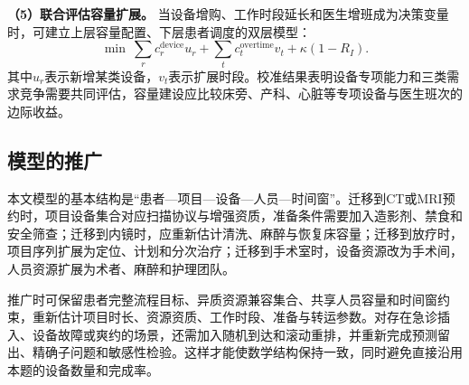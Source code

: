 \textbf{（5）联合评估容量扩展。} 当设备增购、工作时段延长和医生增班成为决策变量时，可建立上层容量配置、下层患者调度的双层模型：
\begin{equation}
\min\ \sum_r c_r^{\mathrm{device}}u_r+
\sum_t c_t^{\mathrm{overtime}}v_t+\kappa(1-R_I).
\end{equation}
其中$u_r$表示新增某类设备，$v_t$表示扩展时段。校准结果表明设备专项能力和三类需求竞争需要共同评估，容量建设应比较床旁、产科、心脏等专项设备与医生班次的边际收益。

\subsection{模型的推广}

本文模型的基本结构是“患者—项目—设备—人员—时间窗”。迁移到CT或MRI预约时，项目设备集合对应扫描协议与增强资质，准备条件需要加入造影剂、禁食和安全筛查；迁移到内镜时，应重新估计清洗、麻醉与恢复床容量；迁移到放疗时，项目序列扩展为定位、计划和分次治疗；迁移到手术室时，设备资源改为手术间，人员资源扩展为术者、麻醉和护理团队。

推广时可保留患者完整流程目标、异质资源兼容集合、共享人员容量和时间窗约束，重新估计项目时长、资源资质、工作时段、准备与转运参数。对存在急诊插入、设备故障或爽约的场景，还需加入随机到达和滚动重排，并重新完成预测留出、精确子问题和敏感性检验。这样才能使数学结构保持一致，同时避免直接沿用本题的设备数量和完成率。
